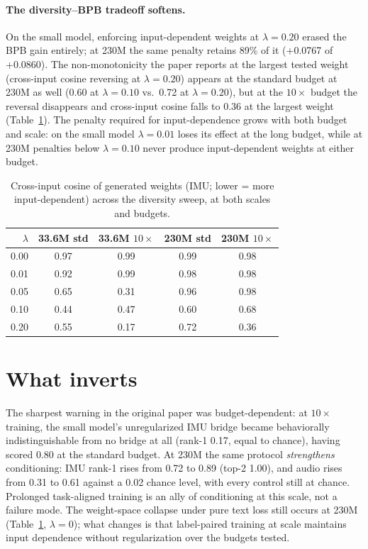 \documentclass[11pt]{article}
\begin{document}
\paragraph{The diversity--BPB tradeoff softens.}
On the small model, enforcing input-dependent weights at $\lambda=0.20$ erased the BPB gain entirely; at 230M the same penalty retains 89\% of it (+0.0767 of +0.0860). The non-monotonicity the paper reports at the largest tested weight (cross-input cosine reversing at $\lambda=0.20$) appears at the standard budget at 230M as well (0.60 at $\lambda=0.10$ vs.\ 0.72 at $\lambda=0.20$), but at the $10\times$ budget the reversal disappears and cross-input cosine falls to 0.36 at the largest weight (Table~\ref{tab:div}). The penalty required for input-dependence grows with both budget and scale: on the small model $\lambda=0.01$ loses its effect at the long budget, while at 230M penalties below $\lambda=0.10$ never produce input-dependent weights at either budget.

\begin{table}[t]
\centering
\caption{Cross-input cosine of generated weights (IMU; lower = more input-dependent) across the diversity sweep, at both scales and budgets.}
\label{tab:div}
\begin{tabular}{rcccc}
\toprule
$\lambda$ & 33.6M std & 33.6M $10\times$ & 230M std & 230M $10\times$ \\
\midrule
0.00 & 0.97 & 0.99 & 0.99 & 0.98 \\
0.01 & 0.92 & 0.99 & 0.98 & 0.98 \\
0.05 & 0.65 & 0.31 & 0.96 & 0.98 \\
0.10 & 0.44 & 0.47 & 0.60 & 0.68 \\
0.20 & 0.55 & 0.17 & 0.72 & 0.36 \\
\bottomrule
\end{tabular}
\end{table}

\section{What inverts}
The sharpest warning in the original paper was budget-dependent: at $10\times$ training, the small model's unregularized IMU bridge became behaviorally indistinguishable from no bridge at all (rank-1 0.17, equal to chance), having scored 0.80 at the standard budget. At 230M the same protocol \emph{strengthens} conditioning: IMU rank-1 rises from 0.72 to 0.89 (top-2 1.00), and audio rises from 0.31 to 0.61 against a 0.02 chance level, with every control still at chance. Prolonged task-aligned training is an ally of conditioning at this scale, not a failure mode. The weight-space collapse under pure text loss still occurs at 230M (Table~\ref{tab:div}, $\lambda=0$); what changes is that label-paired training at scale maintains input dependence without regularization over the budgets tested.
\end{document}
